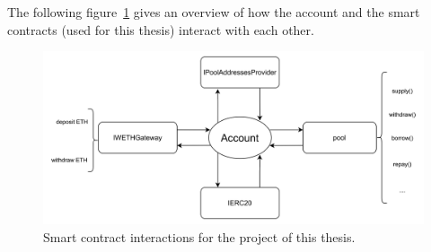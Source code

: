 \documentclass[11pt,a4paper]{report}
\begin{document}
The following figure~\ref{fig:interactionSC} gives an overview of how the account and the  smart contracts (used for this thesis) interact with each other.
\begin{figure}[htp]
	\centering
	\includegraphics[width=1\textwidth]{./images/interactionSC}
	\caption{Smart contract interactions for the project of this thesis.}
	\label{fig:interactionSC}
\end{figure}
\end{document}
